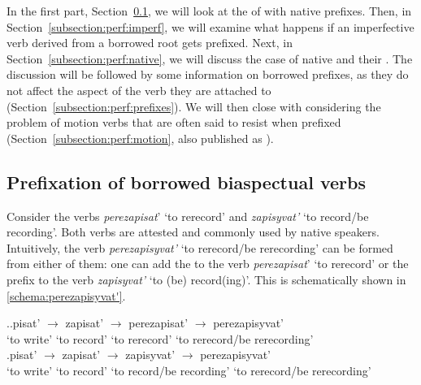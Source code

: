 In the first part, Section~\ref{subsection:perf:borrowed}, we will look at the  of  with native prefixes. Then, in Section~\ref{subsection:perf:imperf}, we will examine what happens if an imperfective verb derived from a borrowed root gets prefixed. Next, in Section~\ref{subsection:perf:native}, we will discuss the case of native  and their . The discussion will be followed by some information on borrowed prefixes, as they do not affect the aspect of the verb they are attached to (Section~\ref{subsection:perf:prefixes}). We will then close with considering the problem of motion verbs that are often said to resist  when prefixed (Section~\ref{subsection:perf:motion}, also published as \citealt{ZinovaOsswald:paper}).

\subsection{Prefixation of borrowed biaspectual verbs}\label{subsection:perf:borrowed}
Consider the verbs \textit{perezapisat}'\textsuperscript{\PF} `to rerecord' and \textit{zapisyvat'}\textsuperscript{\IPF} `to  record/be recording'. Both verbs are attested and commonly used by native speakers. Intuitively, the verb \textit{perezapisyvat'} `to rerecord/be rerecording' can be formed from either of them: one can add the  to the verb \textit{perezapisat}'\textsuperscript{\PF} `to rerecord' or the  prefix  to the verb \textit{zapisyvat'}\textsuperscript{\IPF} `to (be) record(ing)'. This is schematically shown in \ref{schema:perezapisyvat'}.

\ex.\label{schema:perezapisyvat'}\ag.\label{schema:perezapisyvat'1}pisat'\textsuperscript{\IPF} {$\rightarrow$} zapisat'\textsuperscript{\PF} {$\rightarrow$} perezapisat'\textsuperscript{\PF} {$\rightarrow$} perezapisyvat'\textsuperscript{\IPF} \\
{`to write'} {} {`to record'} {} {`to rerecord'} {} {`to rerecord/be rerecording'}\\
\bg.\label{schema:perezapisyvat'2}pisat'\textsuperscript{\IPF} {$\rightarrow$} zapisat'\textsuperscript{\PF} {$\rightarrow$} zapisyvat'\textsuperscript{\IPF} {$\rightarrow$} perezapisyvat'\textsuperscript{\IPF} \\
{`to write'} {} {`to record'} {} {`to record/be recording'} {} {`to rerecord/be rerecording'}\\

